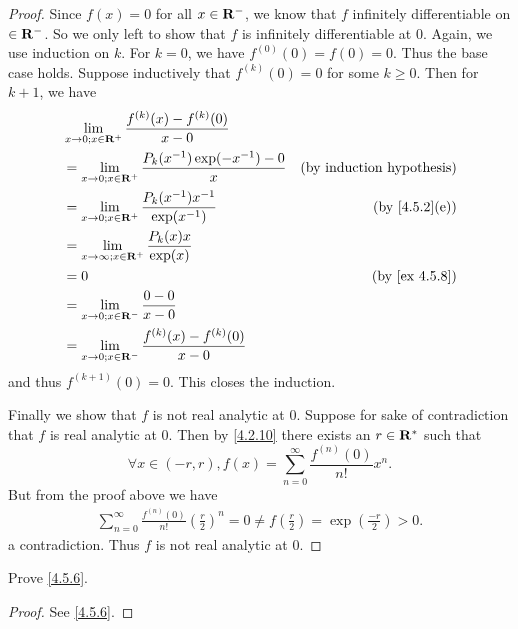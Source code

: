 \begin{proof}
  Since \(f(x) = 0\) for all \(x \in \mathbf{R}^-\), we know that \(f\) infinitely differentiable on \(\in \mathbf{R}^-\).
  So we only left to show that \(f\) is infinitely differentiable at \(0\).
  Again, we use induction on \(k\).
  For \(k = 0\), we have \(f^{(0)}(0) = f(0) = 0\).
  Thus the base case holds.
  Suppose inductively that \(f^{(k)}(0) = 0\) for some \(k \geq 0\).
  Then for \(k + 1\), we have
  \begin{align*}
     & \lim_{x \to 0 ; x \in \R^+} \frac{f^{(k)}(x) - f^{(k)}(0)}{x - 0}                                        \\
     & = \lim_{x \to 0 ; x \in \R^+} \frac{P_k(x^{-1}) \exp(-x^{-1}) - 0}{x} & \text{(by induction hypothesis)} \\
     & = \lim_{x \to 0 ; x \in \R^+} \frac{P_k(x^{-1}) x^{-1}}{\exp(x^{-1})} & \text{(by \cref{4.5.2}(e))}      \\
     & = \lim_{x \to \infty ; x \in \R^+} \frac{P_k(x) x}{\exp(x)}                                              \\
     & = 0                                                                   & \text{(by \cref{ex 4.5.8})}      \\
     & = \lim_{x \to 0 ; x \in \R^-} \frac{0 - 0}{x - 0}                                                        \\
     & = \lim_{x \to 0 ; x \in \R^-} \frac{f^{(k)}(x) - f^{(k)}(0)}{x - 0}
  \end{align*}
  and thus \(f^{(k + 1)}(0) = 0\).
  This closes the induction.

  Finally we show that \(f\) is not real analytic at \(0\).
  Suppose for sake of contradiction that \(f\) is real analytic at \(0\).
  Then by \cref{4.2.10} there exists an \(r \in \mathbf{R}^*\) such that
  \[
    \forall x \in (-r, r), f(x) = \sum_{n = 0}^\infty \frac{f^{(n)}(0)}{n!} x^n.
  \]
  But from the proof above we have
  \begin{align*}
    \sum_{n = 0}^\infty \frac{f^{(n)}(0)}{n!} (\frac{r}{2})^n = 0 \neq f(\frac{r}{2}) = \exp(\frac{-r}{2}) > 0.
  \end{align*}
  a contradiction.
  Thus \(f\) is not real analytic at \(0\).
\end{proof}

\begin{exercise}\label{ex 4.5.5}
  Prove \cref{4.5.6}.
\end{exercise}

\begin{proof}
  See \cref{4.5.6}.
\end{proof}

